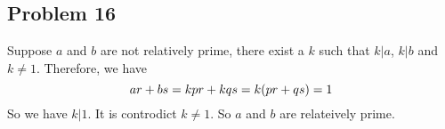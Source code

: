 \subsection*{Problem 16}
\noindent Suppose $a$ and $b$ are not relatively prime, there exist a $k$ such that $k | a$, $k | b$ and $k \neq 1$. Therefore, we have
\begin{equation} \notag
	ar + bs = kpr + kqs = k(pr + qs) = 1
\end{equation}
So we have $k | 1$. It is controdict $k \neq 1$. So $a$ and $b$ are relateively prime.

